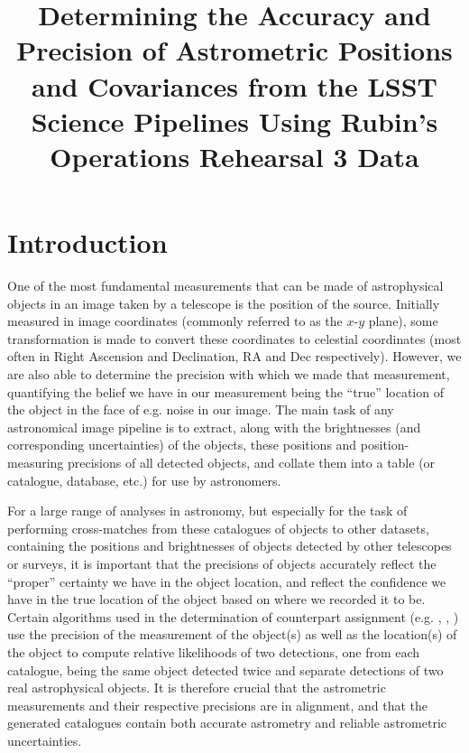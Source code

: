 \documentclass[SE,lsstdraft,authoryear,toc]{lsstdoc}
\title[Determining the Accuracy and Precision of LSST Astrometric Positions and Covariances]{Determining the Accuracy and Precision of Astrometric Positions and Covariances from the LSST Science Pipelines Using Rubin's Operations Rehearsal 3 Data}
\date{\vcsDate}
\begin{document}
\maketitle

\section{Introduction}
\label{sec:intro}
One of the most fundamental measurements that can be made of astrophysical objects in an image taken by a telescope is the position of the source.
Initially measured in image coordinates (commonly referred to as the $x$-$y$ plane), some transformation is made to convert these coordinates to celestial coordinates (most often in Right Ascension and Declination, RA and Dec respectively).
However, we are also able to determine the precision with which we made that measurement, quantifying the belief we have in our measurement being the ``true'' location of the object in the face of e.g. noise in our image.
The main task of any astronomical image pipeline is to extract, along with the brightnesses (and corresponding uncertainties) of the objects, these positions and position-measuring precisions of all detected objects, and collate them into a table (or catalogue, database, etc.) for use by astronomers.

For a large range of analyses in astronomy, but especially for the task of performing cross-matches from these catalogues of objects to other datasets, containing the positions and brightnesses of objects detected by other telescopes or surveys, it is important that the precisions of objects accurately reflect the ``proper'' certainty we have in the object location, and reflect the confidence we have in the true location of the object based on where we recorded it to be.
Certain algorithms used in the determination of counterpart assignment (e.g. \citealp{Budavari:2008aa}, \citealp{2018MNRAS.473.5570W}, \citealp{Pineau:2017aa}) use the precision of the measurement of the object(s) as well as the location(s) of the object to compute relative likelihoods of two detections, one from each catalogue, being the same object detected twice and separate detections of two real astrophysical objects.
It is therefore crucial that the astrometric measurements and their respective precisions are in alignment, and that the generated catalogues contain both accurate astrometry and reliable astrometric uncertainties.
\end{document}

